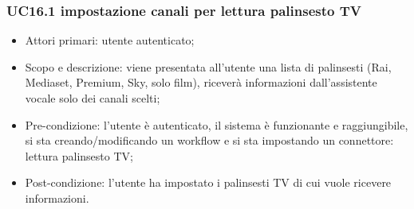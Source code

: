 \subsubsection{UC16.1 impostazione canali per lettura palinsesto TV}
\begin{itemize}
	\item  Attori primari: utente autenticato;
	\item  Scopo e descrizione: viene presentata all'utente una lista di palinsesti (Rai, Mediaset, Premium, Sky, solo film), riceverà informazioni dall'assistente vocale solo dei canali scelti;
	\item  Pre-condizione: l'utente è autenticato, il sistema è funzionante e raggiungibile, si sta creando/modificando un workflow e si sta impostando un connettore: lettura palinsesto TV;
	\item  Post-condizione: l'utente ha impostato i palinsesti TV di cui vuole ricevere informazioni.
\end{itemize}
